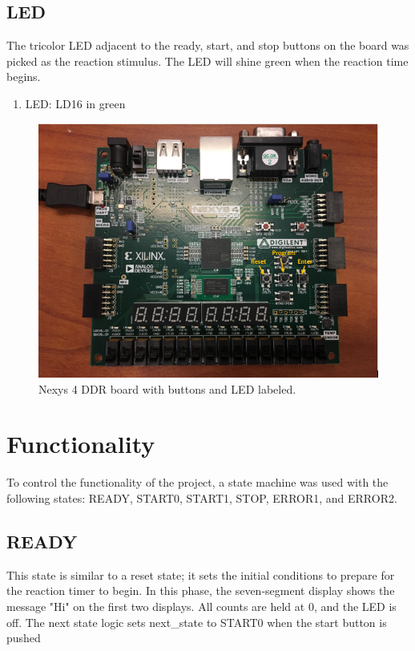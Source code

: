 \documentclass{article}
\begin{document}
\subsection{LED}
The tricolor LED adjacent to the ready, start, and stop buttons on the board was picked as the reaction stimulus. The LED will shine green when the reaction time begins.
\begin{enumerate}
	\item LED: LD16 in green
\end{enumerate}


\begin{figure}[h!]
	\begin{center}
		\caption{Nexys 4 DDR board with buttons and LED labeled.}\label{fig:labeled_board}
		\includegraphics[width=1.0\textwidth]{../images/labeled_board.png}
	\end{center}
\end{figure}

\section{Functionality}
To control the functionality of the project, a state machine was used with the following states: READY, START0, START1, STOP, ERROR1, and ERROR2.

\subsection{READY}
This state is similar to a reset state; it sets the initial conditions to prepare for the reaction timer to begin. 
In this phase, the seven-segment display shows the message "Hi" on the first two displays. All counts are held at 0, and the LED is off. 
The next state logic sets next\_state to START0 when the start button is pushed
\end{document}

